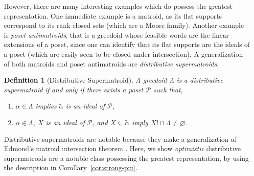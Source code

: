 \documentclass[11pt]{article}
\newtheorem{definition}[theorem]{Definition}
\newcommand{\glang}{\Lambda}
\begin{document}
However, there are many interesting examples which do possess the greatest representation.
One immediate example is a matroid, as its flat supports correspond to its rank closed sets (which are a Moore family).
Another example is \emph{poset antimatroids}, that is a greedoid whose feasible words are the linear extensions of a poset, since one can identify that its flat supports are the ideals of a poset (which are easily seen to be closed under intersection). 
A generalization of both matroids and poset antimatroids are \emph{distributive supermatroids}.
\begin{definition}[Distributive Supermatroid]
    A greedoid $\glang$ is a \emph{distributive supermatroid} if and only if there exists a poset $\mathscr{P}$ such that,
    \begin{enumerate}
        \item $\alpha \in \glang$ implies $\widetilde{\alpha}$ is an ideal of $\mathscr{P}$,
        \item $\alpha \in \glang$, $X$ is an ideal of $\mathscr{P}$, and $X\subseteq \widetilde{\alpha}$ imply $X!\cap\glang \neq \varnothing$.
    \end{enumerate}
\end{definition}

Distributive supermatroids are notable because they make a generalization of Edmond's matroid intersection theorem \cite{tardos1990intersection, edmonds1979matroid}.
Here, we show \emph{optimistic} distributive supermatroids are a notable class possessing the greatest representation, by using the description in Corollary~\ref{cor:strong-pm}.
\end{document}
